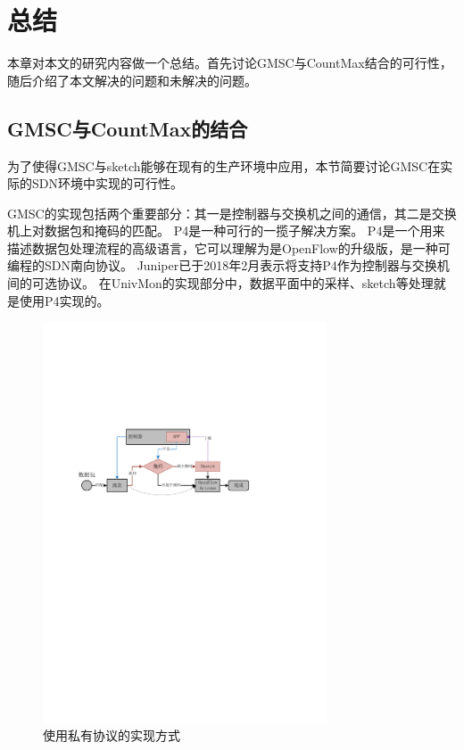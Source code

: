 \chapter{总结}
本章对本文的研究内容做一个总结。首先讨论GMSC与CountMax结合的可行性，随后介绍了本文解决的问题和未解决的问题。

\section{GMSC与CountMax的结合}

为了使得GMSC与sketch能够在现有的生产环境中应用，本节简要讨论GMSC在实际的SDN环境中实现的可行性。

GMSC的实现包括两个重要部分：其一是控制器与交换机之间的通信，其二是交换机上对数据包和掩码的匹配。
P4\cite{bosshart2014p4}是一种可行的一揽子解决方案。
P4是一个用来描述数据包处理流程的高级语言，它可以理解为是OpenFlow的升级版，是一种可编程的SDN南向协议。
Juniper已于2018年2月表示将支持P4作为控制器与交换机间的可选协议\cite{juniper2018p4}。
在UnivMon\cite{liu2016one}的实现部分中，数据平面中的采样、sketch等处理就是使用P4实现的。

\begin{figure}[ht]
	\centering
	\includegraphics[width=0.75\textwidth]{fig/private.pdf}
	\caption{使用私有协议的实现方式}
	\label{fig:private}
\end{figure}

